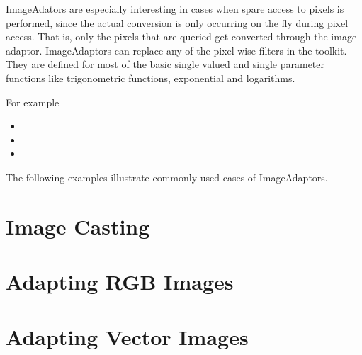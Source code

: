 ImageAdators are especially interesting in cases when spare access to pixels is
performed, since the actual conversion is only occurring on the fly during
pixel access. That is, only the pixels that are queried get converted through
the image adaptor.  ImageAdaptors can replace any of the pixel-wise filters in
the toolkit. They are defined for most of the basic single valued and single
parameter functions like trigonometric functions, exponential and logarithms.

For example

\begin{itemize}
\item {}
\item {}
\item {}
\end{itemize}

The following examples illustrate commonly used cases of ImageAdaptors.

\section{Image Casting}
\label{sec:ImageAdaptorForBasicCasting}
\ifitkFullVersion

\fi

\section{Adapting RGB Images}
\label{sec:ImageAdaptorForRGB}
\ifitkFullVersion

\fi


\section{Adapting Vector Images}
\label{sec:ImageAdaptorForVectors}
\ifitkFullVersion

\fi


